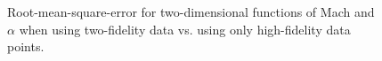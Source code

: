 \begin{figure}
    \centering
    \begin{subfigure}[RMSE for $C_L$.] {
        \texttt{[image: images/cl\_2d\_rsme\_lhs\_comp.eps]} }
    \end{subfigure}
    \hfill
    \begin{subfigure}[RMSE for $C_D$.]{
        \texttt{[image: images/cd\_2d\_rsme\_lhs\_comp.eps]} 
    }
    \end{subfigure}
    \hfill
    \begin{subfigure}[RMSE for $C_m$.]{
        \texttt{[image: images/cm\_2d\_rsme\_lhs\_comp.eps]} 
    }
    \end{subfigure}
    \caption{Root-mean-square-error for two-dimensional functions of Mach and $\alpha$ when using two-fidelity data vs. using only high-fidelity data points.\label{fig:2d_mf_vs_hf}}
\end{figure}
